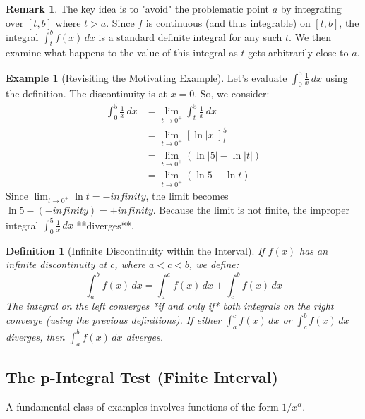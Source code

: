 \documentclass[11pt]{article}
\def\infty{infinity}%
\newtheorem{definition}[theorem]{Definition}
\theoremstyle{definition}
\newtheorem{example}[theorem]{Example}
\newtheorem{remark}[theorem]{Remark}
\newcommand{\dx}{\, dx} %
\begin{document}
\begin{remark}
    The key idea is to "avoid" the problematic point $a$ by integrating over $[t, b]$ where $t > a$. Since $f$ is continuous (and thus integrable) on $[t, b]$, the integral $\int_t^b f(x) \dx$ is a standard definite integral for any such $t$. We then examine what happens to the value of this integral as $t$ gets arbitrarily close to $a$.
\end{remark}

\begin{example}[Revisiting the Motivating Example]
    Let's evaluate $\int_0^5 \frac{1}{x} \dx$ using the definition.
    The discontinuity is at $x=0$. So, we consider:
    \begin{align*} \int_0^5 \frac{1}{x} \dx &= \lim_{t \to 0^+} \int_t^5 \frac{1}{x} \dx \\ &= \lim_{t \to 0^+} \left[ \ln|x| \right]_t^5 \\ &= \lim_{t \to 0^+} (\ln|5| - \ln|t|) \\ &= \lim_{t \to 0^+} (\ln 5 - \ln t) \end{align*}
    Since $\lim_{t \to 0^+} \ln t = -\infty$, the limit becomes $\ln 5 - (-\infty) = +\infty$.
    Because the limit is not finite, the improper integral $\int_0^5 \frac{1}{x} \dx$ **diverges**.
\end{example}

\begin{definition}[Infinite Discontinuity within the Interval]
    If $f(x)$ has an infinite discontinuity at $c$, where $a < c < b$, we define:
    \[
    \int_a^b f(x) \dx = \int_a^c f(x) \dx + \int_c^b f(x) \dx
    \]
    The integral on the left converges *if and only if* both integrals on the right converge (using the previous definitions). If either $\int_a^c f(x) \dx$ or $\int_c^b f(x) \dx$ diverges, then $\int_a^b f(x) \dx$ diverges.
\end{definition}

\subsection{The p-Integral Test (Finite Interval)}

A fundamental class of examples involves functions of the form $1/x^\alpha$.
\end{document}
